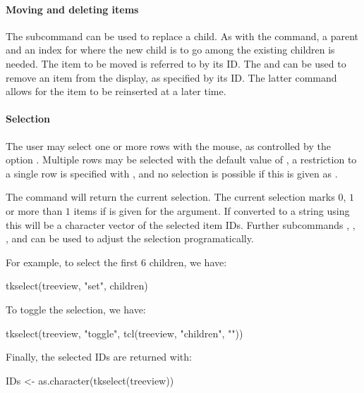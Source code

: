 \paragraph{Moving and deleting items}
The  subcommand can be used to replace a
child. As with the  command, a parent and an index for
where the new child is to go among the existing children is needed. The
item to be moved is referred to by its ID. The
 and 
can be used to remove an item from the display, as specified by its
ID. The latter command allows for the item to be reinserted at a later
time.


\paragraph{Selection}
The user may select one or more rows with the mouse, as controlled by
the option . Multiple rows may be
selected with the default value of , a restriction to
a single row is specified with , and no selection is
possible if this is given as .

The  command will return the current
selection. The current selection marks $0$, $1$ or more than $1$ items if
 is given for the  argument.  If
converted to a string using  this will be a
character vector of the selected item IDs. Further subcommands
, , , and  can be used
to adjust the selection programatically.

For example, to select the first 6 children, we have:
\begin{Schunk}
\begin{Sinput}
 tkselect(treeview, "set", children)
\end{Sinput}
\end{Schunk}
%
To toggle the selection, we have:
\begin{Schunk}
\begin{Sinput}
 tkselect(treeview, "toggle", tcl(treeview, "children", ""))
\end{Sinput}
\end{Schunk}
%
Finally, the selected IDs are returned with:
\begin{Schunk}
\begin{Sinput}
 IDs <- as.character(tkselect(treeview))
\end{Sinput}
\end{Schunk}

